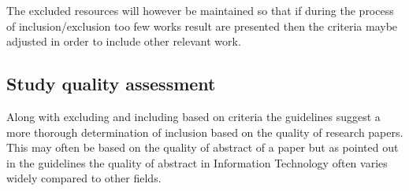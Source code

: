 \noindent
The excluded resources will however be maintained so that if during the process of inclusion/exclusion too few works result are presented then the criteria maybe adjusted in order to include other relevant work.

\subsection{Study quality assessment}

Along with excluding and including based on criteria the guidelines suggest a more thorough determination of inclusion based on the quality of research papers. This may often be based on the quality of abstract of a paper but as pointed out in the guidelines the quality of abstract in Information Technology often varies widely compared to other fields.











